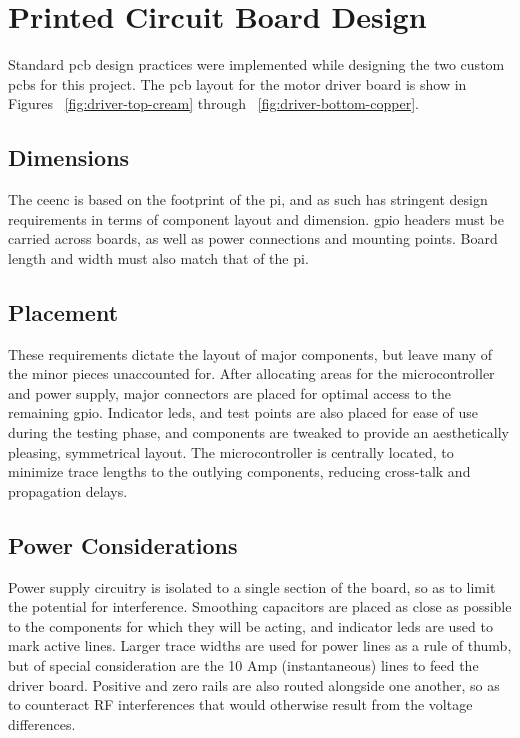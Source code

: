 \newpage
\section{Printed Circuit Board Design}
Standard \gls{pcb} design practices were implemented while designing the two custom \gls{pcb}s for this project.
The \gls{pcb} layout for the motor driver board is show in Figures ~\ref{fig:driver-top-cream} through ~\ref{fig:driver-bottom-copper}.

\subsection{Dimensions}
The \gls{ceenc} is based on the footprint of the \gls{pi}, and as such has stringent design requirements in terms of component layout and dimension.
\gls{gpio} headers must be carried across boards, as well as power connections and mounting points. Board length and width must also match that of the \gls{pi}. 

\subsection{Placement}
These requirements dictate the layout of major components, but leave many of the minor pieces unaccounted for.
After allocating areas for the microcontroller and power supply, major connectors are placed for optimal access to the remaining \gls{gpio}.
Indicator \gls{led}s, and test points are also placed for ease of use during the testing phase, and components are tweaked to provide an aesthetically pleasing, symmetrical layout.
The microcontroller is centrally located, to minimize trace lengths to the outlying components, reducing cross-talk and propagation delays.

\subsection{Power Considerations}
Power supply circuitry is isolated to a single section of the board, so as to limit the potential for interference.
Smoothing capacitors are placed as close as possible to the components for which they will be acting, and indicator \gls{led}s are used to mark active lines.
Larger trace widths are used for power lines as a rule of thumb, but of special consideration are the 10 Amp (instantaneous) lines to feed the driver board.
Positive and zero rails are also routed alongside one another, so as to counteract RF interferences that would otherwise result from the voltage differences.
